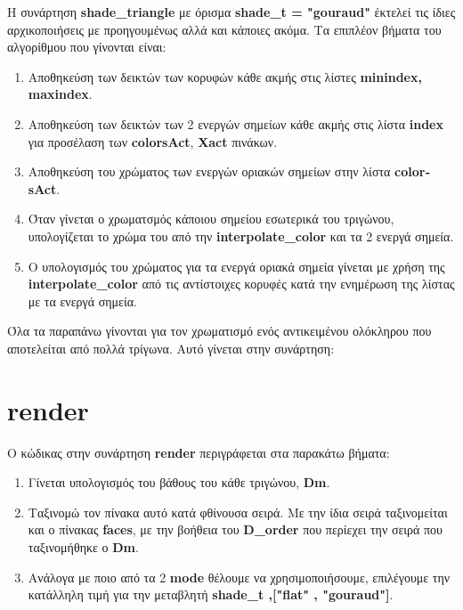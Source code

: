 \documentclass[10pt,a4paper]{article}
\begin{document}
H συνάρτηση \textbf{\textlatin{shade\_triangle}} με όρισμα \textbf{\textlatin{shade\_t = "gouraud"}} έκτελεί τις ίδιες αρχικοποιήσεις με προηγουμένως αλλά και κάποιες ακόμα. Τα επιπλέον βήματα του αλγορίθμου που γίνονται είναι:
\begin{enumerate}
    \item Αποθηκεύση των δεικτών των κορυφών κάθε ακμής στις λίστες \textbf{\textlatin{minindex, maxindex}}.
    \item Αποθηκεύση των δεικτών των 2 ενεργών σημείων κάθε ακμής στις λίστα \textbf{\textlatin{index}} για προσέλαση των \textbf{\textlatin{colorsAct}}, \textbf{\textlatin{Xact}} πινάκων.
    \item Αποθηκεύση του χρώματος των ενεργών οριακών σημείων στην λίστα  \textbf{\textlatin{colorsAct}}.
    \item Όταν γίνεται ο χρωματσμός κάποιου σημείου εσωτερικά του τριγώνου, υπολογίζεται το χρώμα του από την \textbf{\textlatin{interpolate\_color}} και τα 2 ενεργά σημεία. 
    \item Ο υπολογισμός του χρώματος για τα ενεργά οριακά σημεία γίνεται με χρήση της \textbf{\textlatin{interpolate\_color}} από τις αντίστοιχες κορυφές κατά την ενημέρωση της λίστας με τα ενεργά σημεία.
\end{enumerate}

Όλα τα παραπάνω γίνονται για τον χρωματισμό ενός αντικειμένου
ολόκληρου που αποτελείται από πολλά τρίγωνα. Αυτό γίνεται στην συνάρτηση:

\section*{\textlatin{render}}
Ο κώδικας στην συνάρτηση \textbf{\textlatin{render}} περιγράφεται στα παρακάτω βήματα:

\begin{enumerate}
    \item Γίνεται υπολογισμός του βάθους του κάθε τριγώνου, \textbf{\textlatin{Dm}}.
    \item Ταξινομώ τον πίνακα αυτό κατά φθίνουσα σειρά. Με την ίδια σειρά ταξινομείται και ο πίνακας \textbf{\textlatin{faces}}, με την βοήθεια του \textbf{\textlatin{D\_order}} που περίεχει την σειρά που ταξινομήθηκε ο \textbf{\textlatin{Dm}}.
    \item Ανάλογα με ποιο από τα 2 \textbf{\textlatin{mode}} θέλουμε να χρησιμοποιήσουμε, επιλέγουμε την κατάλληλη τιμή για την μεταβλητή  \textbf{\textlatin{shade\_t ,["flat" , "gouraud"]}}.
 \end{enumerate}
\end{document}
